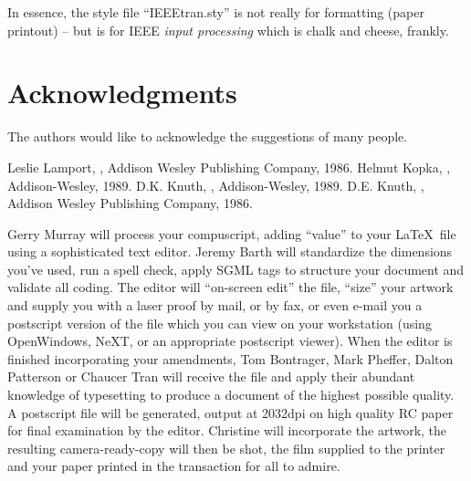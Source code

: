 In essence, the style file ``IEEEtran.sty'' is not really for
formatting (paper printout) -- but is for IEEE {\em
input processing\/} which is chalk and cheese, frankly.


\section*{Acknowledgments}
The authors would like to acknowledge the suggestions of many people.


\nocite{*}


%
\begin{thebibliography}{1}
Leslie Lamport,
,
\newblock Addison Wesley Publishing Company, 1986.
Helmut Kopka,
,
\newblock Addison-Wesley, 1989.
D.K. Knuth,
,
\newblock Addison-Wesley, 1989.
D.E. Knuth,
,
\newblock Addison Wesley Publishing Company, 1986.
\end{thebibliography}
%

\begin{biography}{Gerry Murray} will process your compu\-script,
adding ``value'' to your \LaTeX\ file using a sophisticated text
editor. Jeremy Barth will standardize the dimensions you've used, run
a spell check, apply SGML tags to structure your document and validate
all coding. The editor will ``on-screen edit'' the file, ``size'' your
artwork and supply you with a laser proof by mail, or by fax, or even
e-mail you a postscript version of the file which you can view on your
workstation (using OpenWindows, NeXT, or an appropriate postscript
viewer). When the editor is finished incorporating your amendments,
Tom Bontrager, Mark Pheffer, Dalton Patterson or Chaucer Tran will
receive the file and apply their abundant knowledge of typesetting to
produce a document of the highest possible quality. A postscript file
will be generated, output at 2032dpi on high quality RC paper for
final examination by the editor. Christine will incorporate the
artwork, the resulting camera-ready-copy will then be shot, the film
supplied to the printer and your paper printed in the transaction for
all to admire.
\end{biography}






	
